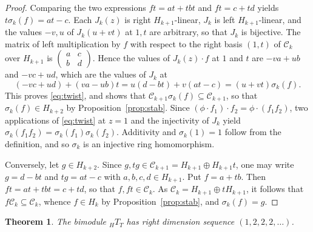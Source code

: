 \documentclass[11pt,a4paper]{amsart}
\newtheorem{theorem}{Theorem}[section]
\numberwithin{equation}{section}
\newcommand{\C}{\mathcal{C}}
\begin{document}
\begin{proof}
Comparing the two expressions $ft=at+tbt$ and $ft=c+td$ yields $t\sigma_k(f)=at-c$. Each $J_k(z)$ is right $H_{k+1}$-linear, $J_k$ is left $H_{k+1}$-linear, and the values $-v,u$ of $J_k(u+vt)$ at $1,t$ are arbitrary, so that $J_k$ is bijective. The matrix of left multiplication by $f$ with respect to the right basis $(1,t)$ of $\C_k$ over $H_{k+1}$ is $\left(\begin{smallmatrix}a&c\\b&d\end{smallmatrix}\right)$. Hence the values of $J_k(z)\cdot f$ at $1$ and $t$ are $-va+ub$ and $-vc+ud$, which are the values of $J_k$ at
\[
(-vc+ud)+(va-ub)t=u(d-bt)+v(at-c)=(u+vt)\sigma_k(f).
\]
This proves \eqref{eq:twist}, and shows that $\C_{k+1}\sigma_k(f)\subseteq\C_{k+1}$, so that $\sigma_k(f)\in H_{k+2}$ by Proposition~\ref{prop:stab}. Since $(\phi\cdot f_1)\cdot f_2=\phi\cdot(f_1f_2)$, two applications of \eqref{eq:twist} at $z=1$ and the injectivity of $J_k$ yield $\sigma_k(f_1f_2)=\sigma_k(f_1)\sigma_k(f_2)$. Additivity and $\sigma_k(1)=1$ follow from the definition, and so $\sigma_k$ is an injective ring homomorphism.

Conversely, let $g\in H_{k+2}$. Since $g,tg\in\C_{k+1}=H_{k+1}\oplus H_{k+1}t$, one may write $g=d-bt$ and $tg=at-c$ with $a,b,c,d\in H_{k+1}$. Put $f=a+tb$. Then $ft=at+tbt=c+td$, so that $f,ft\in\C_k$. As $\C_k=H_{k+1}\oplus tH_{k+1}$, it follows that $f\C_k\subseteq\C_k$, whence $f\in H_k$ by Proposition~\ref{prop:stab}, and $\sigma_k(f)=g$.
\end{proof}

\begin{theorem}\label{thm:dimseq}
The bimodule ${}_HT_T$ has right dimension sequence $(1,2,2,2,\dots)$.
\end{theorem}
\end{document}
